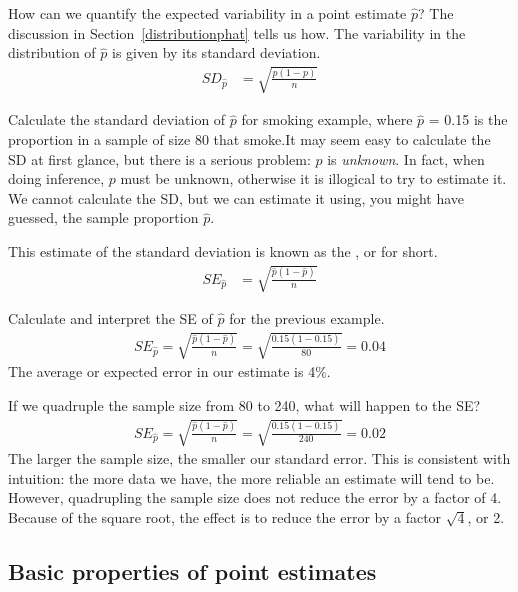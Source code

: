 How can we quantify the expected variability in a point estimate $\hat{p}$? The discussion in Section~\ref{distributionphat} tells us how. The variability in the distribution of $\hat{p}$ is given by its standard deviation.
\begin{align*}
SD_{\hat{p}}&=\sqrt{\frac{p(1-p)}{n}}
\end{align*}

\begin{example}{Calculate the standard deviation of $\hat{p}$ for smoking example, where $\hat{p}$ = 0.15 is the proportion in a sample of size 80 that smoke.}It may seem easy to calculate the SD at first glance, but there is a serious problem: $p$ is \emph{unknown}. In fact, when doing inference, $p$ must be unknown, otherwise it is illogical to try to estimate it. We cannot calculate the SD, but we can estimate it using, you might have guessed, the sample proportion $\hat{p}$.
\end{example}
 
This estimate of the standard deviation is known as the , or  for short.
\begin{align*}
SE_{\hat{p}}&=\sqrt{\frac{\hat{p}(1-\hat{p})}{n}}
\end{align*}

\begin{example}{Calculate and interpret the SE of $\hat{p}$ for the previous example.}
\begin{align*}
SE_{\hat{p}}=\sqrt{\frac{\hat{p}(1-\hat{p})}{n}} =\sqrt{\frac{0.15(1-0.15)}{80}}=0.04
\end{align*}
The average or expected error in our estimate is 4\%.
\end{example}

\begin{example}{If we quadruple the sample size from 80 to 240, what will happen to the SE?}
\begin{align*}
SE_{\hat{p}}=\sqrt{\frac{\hat{p}(1-\hat{p})}{n}} =\sqrt{\frac{0.15(1-0.15)}{240}}=0.02
\end{align*}
The larger the sample size, the smaller our standard error. This is consistent with intuition: the more data we have, the more reliable an estimate will tend to be. However, quadrupling the sample size does not reduce the error by a factor of 4. Because of the square root, the effect is to reduce the error by a factor $\sqrt{4}$, or 2. 
\end{example}


\subsection{Basic properties of point estimates}

